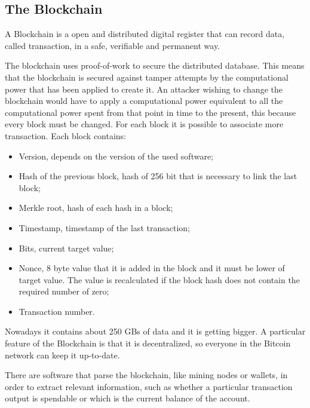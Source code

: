 \documentclass{article}
\begin{document}
\subsection*{The Blockchain}
A Blockchain is a open and distributed digital register that can record data, called transaction, in a safe, verifiable and permanent way.\par\noindent
The blockchain uses proof-of-work to secure the distributed database. This means that the blockchain is secured against tamper attempts by the computational power that has been applied to create it. An attacker wishing to change the blockchain would have to apply a computational power equivalent to all the computational power spent from that point in time to the present, this because every block must be changed.\newline
For each block it is possible to associate more transaction. Each block contains:
\begin{itemize}
    \item Version, depends on the version of the used software;
    \item Hash of the previous block, hash of 256 bit that is necessary to link the
last block;
    \item Merkle root, hash of each hash in a block;
    \item Timestamp, timestamp of the last transaction;
    \item Bits, current target value;
    \item Nonce, 8 byte value that it is added in the block and it must be lower of
target value. The value is recalculated if the block hash does not contain
the required number of zero;
    \item Transaction number.
\end{itemize}
Nowadays it contains about 250 GBs of data and it is getting bigger. A particular feature of the Blockchain is that it is decentralized, so everyone in the Bitcoin network can keep it up-to-date.\par

\noindent There are software that parse the blockchain, like mining nodes or wallets, in order to extract relevant information, such as whether a particular transaction output is spendable or which is the current balance of the account.
\end{document}

